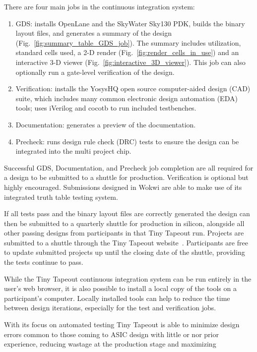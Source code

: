 There are four main jobs in the continuous integration system:

\begin{enumerate}
	\item GDS: installs OpenLane\cite{openlane} and the SkyWater Sky130\cite{skywaterpdk} PDK, builds the binary layout files, and generates a summary of the design (Fig.~\ref{fig:summary_table_GDS_job}). The summary includes utilization, standard cells used, a 2-D render (Fig.~\ref{fig:render_cells_in_use}) and an interactive 3-D viewer (Fig.~\ref{fig:interactive_3D_viewer}).
This job can also optionally run a gate-level verification of the design.
	\item Verification: installs the YosysHQ open source computer-aided design (CAD) suite, which includes many common electronic design automation (EDA) tools; uses iVerilog\cite{iverilog} and cocotb\cite{cocotb} to run included testbenches.
	\item Documentation: generates a preview of the documentation.
	\item Precheck: runs design rule check (DRC) tests to ensure the design can be integrated into the multi project chip.
\end{enumerate}

Successful GDS, Documentation, and Precheck job completion are all required for a design to be submitted to a shuttle for production.
Verification is optional but highly encouraged. Submissions designed in Wokwi are able to make use of its integrated truth table testing system\cite{automatedtesting}.

If all tests pass and the binary layout files are correctly generated the design can then be submitted to a quarterly shuttle for production in silicon, alongside all other passing designs from participants in that Tiny Tapeout run. Projects are submitted to a shuttle through the Tiny Tapeout website~\cite{tinytapeout}. Participants are free to update submitted projects up until the closing date of the shuttle, providing the tests continue to pass.

While the Tiny Tapeout continuous integration system can be run entirely in the user's web browser, it is also possible to install a local copy of the tools\cite{localinstall} on a participant's computer. Locally installed tools can help to reduce the time between design iterations, especially for the test and verification jobs.

With its focus on automated testing Tiny Tapeout is able to minimize design errors common to those coming to ASIC design with little or nor prior experience, reducing wastage at the production stage and maximizing

